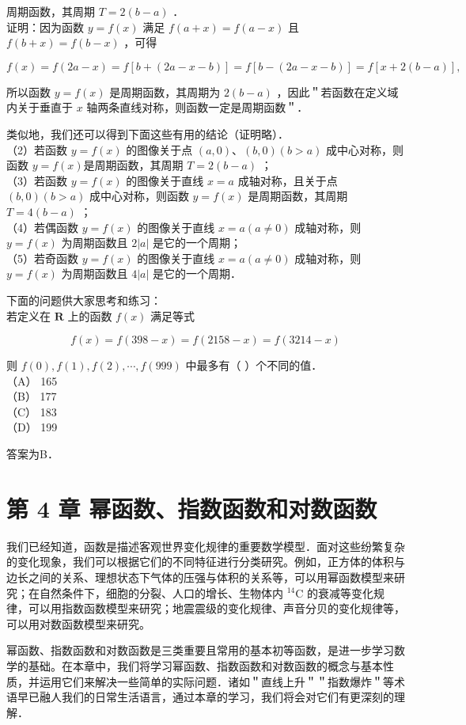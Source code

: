 \documentclass[10pt]{article}
\begin{document}
周期函数，其周期 \(T=2(b-a)\) ．\\
证明：因为函数 \(y=f(x)\) 满足 \(f(a+x)=f(a-x)\) 且 \(f(b+x)=f(b-x)\) ，可得

\[
f(x)=f(2 a-x)=f[b+(2 a-x-b)]=f[b-(2 a-x-b)]=f[x+2(b-a)],
\]

所以函数 \(y=f(x)\) 是周期函数，其周期为 \(2(b-a)\) ，因此＂若函数在定义域内关于垂直于 \(x\) 轴两条直线对称，则函数一定是周期函数＂．

类似地，我们还可以得到下面这些有用的结论（证明略）．\\
（2）若函数 \(y=f(x)\) 的图像关于点 \((a, 0) 、(b, 0)(b>a)\) 成中心对称，则函数 \(y=f(x)\)是周期函数，其周期 \(T=2(b-a)\) ；\\
（3）若函数 \(y=f(x)\) 的图像关于直线 \(x=a\) 成轴对称，且关于点 \((b, 0)(b>a)\) 成中心对称，则函数 \(y=f(x)\) 是周期函数，其周期 \(T=4(b-a)\) ；\\
（4）若偶函数 \(y=f(x)\) 的图像关于直线 \(x=a(a \neq 0)\) 成轴对称，则 \(y=f(x)\) 为周期函数且 \(2|a|\) 是它的一个周期；\\
（5）若奇函数 \(y=f(x)\) 的图像关于直线 \(x=a(a \neq 0)\) 成轴对称，则 \(y=f(x)\) 为周期函数且 \(4|a|\) 是它的一个周期．

下面的问题供大家思考和练习：\\
若定义在 \(\mathbf{R}\) 上的函数 \(f(x)\) 满足等式

\[
f(x)=f(398-x)=f(2158-x)=f(3214-x)
\]

则 \(f(0), f(1), f(2), \cdots, f(999)\) 中最多有（ ）个不同的值．\\
（A） 165\\
（B） 177\\
（C） 183\\
（D） 199

答案为B．

\section*{第 4 章 幂函数、指数函数和对数函数}
我们已经知道，函数是描述客观世界变化规律的重要数学模型．面对这些纷繁复杂的变化现象，我们可以根据它们的不同特征进行分类研究。例如，正方体的体积与边长之间的关系、理想状态下气体的压强与体积的关系等，可以用幂函数模型来研究；在自然条件下，细胞的分裂、人口的增长、生物体内 \({ }^{14} \mathrm{C}\) 的衰减等变化规律，可以用指数函数模型来研究；地震震级的变化规律、声音分贝的变化规律等，可以用对数函数模型来研究。

幂函数、指数函数和对数函数是三类重要且常用的基本初等函数，是进一步学习数学的基础。在本章中，我们将学习幂函数、指数函数和对数函数的概念与基本性质，并运用它们来解决一些简单的实际问题．诸如＂直线上升＂＂指数爆炸＂等术语早已融人我们的日常生活语言，通过本章的学习，我们将会对它们有更深刻的理解．
\end{document}
